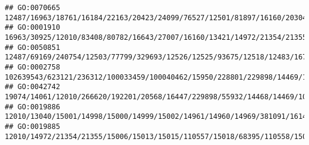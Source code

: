 \documentclass[
]{article}
\begin{document}
\begin{verbatim}
## GO:0070665                                                                                                                                                                                                                                   12487/16963/18761/16184/22163/20423/24099/76527/12501/81897/16160/20304/12775/20533/14165/321019/72049/320484/15000/14999/547431/11629/16149/12511/60533/58205/20371/12229
## GO:0001910                                                                                                                                                                                                                                                 16963/30925/12010/83408/80782/16643/27007/16160/13421/14972/21354/21355/15006/15013/15015/110557/15018/68395/110558/15039/100529082/15024/667977/14990/20400
## GO:0050851                                                                                                                                                                                                                       12487/69169/240754/12503/77799/329693/12526/12525/93675/12518/12483/16797/12478/12501/12047/67596/78473/12775/15985/12143/547431/100038862/632126/624681/74556/12482/20371/20400/12229
## GO:0002758                                                                                                                                                           102639543/623121/236312/100033459/100040462/15950/228801/229898/14469/100061/231655/246727/23961/23960/246730/414084/16643/27007/20128/54123/234311/81897/327957/637515/80861/382551/58185/16364/54483/15511/224762/224840/12475/60533/71398/12229
## GO:0042742                                                                                                                 19074/14061/12010/266620/192201/20568/16447/229898/55932/14468/14469/100038882/16069/76074/246728/246727/23961/23960/246730/109648/27007/244202/66298/634825/382059/100041759/13237/13239/626682/626708/100041952/503491/81897/16160/18126/66107/76758/78416/331063/270328/74548/57757/14972
## GO:0019886                                                                                                                                                                                                                                                                                                                                     12010/13040/15001/14998/15000/14999/15002/14961/14960/14969/381091/16149
## GO:0019885                                                                                                                                                                                                                                                                                                       12010/14972/21354/21355/15006/15013/15015/110557/15018/68395/110558/15039/100529082/15024/667977/14990

\end{verbatim}
\end{document}
